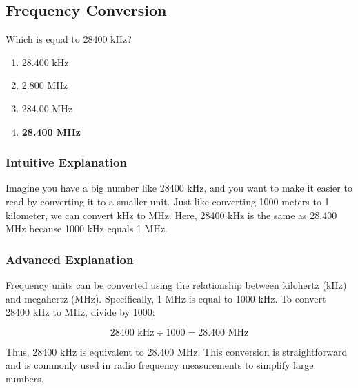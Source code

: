 \subsection{Frequency Conversion}
\label{T5B12}

\begin{tcolorbox}[colback=gray!10!white,colframe=black!75!black,title=T5B12]
Which is equal to 28400 kHz?
\begin{enumerate}[noitemsep]
    \item 28.400 kHz
    \item 2.800 MHz
    \item 284.00 MHz
    \item \textbf{28.400 MHz}
\end{enumerate}
\end{tcolorbox}

\subsubsection{Intuitive Explanation}
Imagine you have a big number like 28400 kHz, and you want to make it easier to read by converting it to a smaller unit. Just like converting 1000 meters to 1 kilometer, we can convert kHz to MHz. Here, 28400 kHz is the same as 28.400 MHz because 1000 kHz equals 1 MHz.

\subsubsection{Advanced Explanation}
Frequency units can be converted using the relationship between kilohertz (kHz) and megahertz (MHz). Specifically, 1 MHz is equal to 1000 kHz. To convert 28400 kHz to MHz, divide by 1000:

\[
28400 \text{ kHz} \div 1000 = 28.400 \text{ MHz}
\]

Thus, 28400 kHz is equivalent to 28.400 MHz. This conversion is straightforward and is commonly used in radio frequency measurements to simplify large numbers.